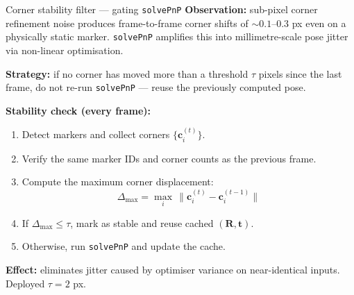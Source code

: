 \documentclass[10pt,aspectratio=169]{beamer}
\begin{document}
\begin{frame}{Corner stability filter --- gating \texttt{solvePnP}}
\textbf{Observation:} sub-pixel corner refinement noise produces frame-to-frame corner shifts of $\sim 0.1$--$0.3$ px even on a physically static marker. \texttt{solvePnP} amplifies this into millimetre-scale pose jitter via non-linear optimisation.

\textbf{Strategy:} if no corner has moved more than a threshold $\tau$ pixels since the last frame, do not re-run \texttt{solvePnP} --- reuse the previously computed pose.

\textbf{Stability check (every frame):}
\begin{enumerate}
    \item Detect markers and collect corners $\{\mathbf{c}_i^{(t)}\}$.
    \item Verify the same marker IDs and corner counts as the previous frame.
    \item Compute the maximum corner displacement:
    \[
    \Delta_{\max} = \max_i \, \bigl\| \mathbf{c}_i^{(t)} - \mathbf{c}_i^{(t-1)} \bigr\|
    \]
    \item If $\Delta_{\max} \le \tau$, mark as stable and reuse cached $(\mathbf{R}, \mathbf{t})$.
    \item Otherwise, run \texttt{solvePnP} and update the cache.
\end{enumerate}

\textbf{Effect:} eliminates jitter caused by optimiser variance on near-identical inputs. Deployed $\tau = 2$ px.
\end{frame}
\end{document}
